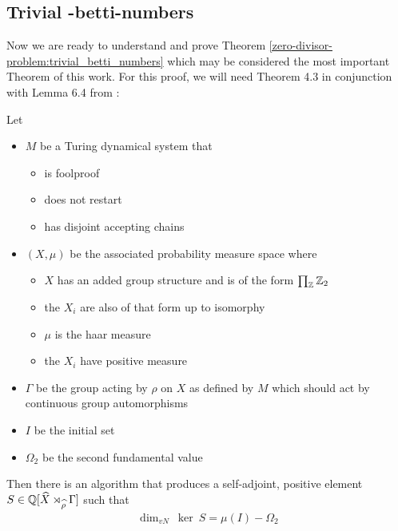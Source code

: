\subsection{Trivial \ltwo-betti-numbers}
\label{the_zero_divisor_problem:main_theorem}

Now we are ready to understand and prove Theorem \ref{zero-divisor-problem:trivial_betti_numbers} which may be considered the most important Theorem of this work.
For this proof, we will need Theorem 4.3 in conjunction with Lemma 6.4 from \cite{gra14}:

\begin{Theorem}
	\label{the_zero_divisor_problem:grabowskis_theorem}
	Let
	\begin{itemize}
		\item{
			$M$ be a Turing dynamical system that
			\begin{itemize}
				\item is foolproof
				\item does not restart
				\item has disjoint accepting chains
			\end{itemize}
		}
		\item{
			$(X, \mu)$ be the associated probability measure space where
			\begin{itemize}
				\item $X$ has an added group structure and is of the form $\prod_{\mathbb{Z}} \mathbb{Z}_2$
				\item the $X_i$ are also of that form up to isomorphy
				\item $\mu$ is the haar measure
				\item the $X_i$ have positive measure
			\end{itemize}
		}
		\item $\Gamma$ be the group acting by $\rho$ on $X$ as defined by $M$ which should act by continuous group automorphisms\footnotemark
		\item $I$ be the initial set
		\item $\Omega_2$ be the second fundamental value
	\end{itemize}

	Then there is an algorithm that produces a self-adjoint, positive element $S \in \mathbb{Q}[\widehat{X} \rtimes_{\widehat{\rho}} \Gamma]$ such that
	\begin{align*}
		\dim_{vN} ~ \ker ~ S = \mu(I) - \Omega_2
	\end{align*}
\end{Theorem}

